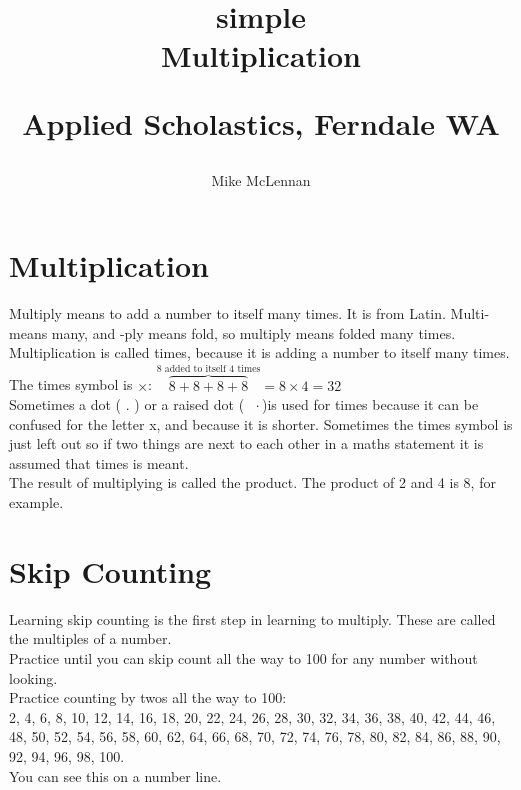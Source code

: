 \documentclass{article}
\author{Mike McLennan}
\date{}
\title{simple\\Multiplication\\
\vspace{28pt}
\begin{normalsize}Applied Scholastics, Ferndale WA \end{normalsize}}
\begin{document}
\maketitle
\pagebreak
\tableofcontents
\pagebreak
\begin{spacing}{1.25}

\section{Multiplication}
Multiply means to add a number to itself many times. It is from Latin. Multi- means many, and -ply means fold, so multiply means folded many times.\\

Multiplication is called times, because it is adding a number to itself many times.\\

The times symbol is $\times$: 
$\overbrace{8+8+8+8}^{\textrm{8 added to itself 4 times}}= 8 \times 4 = 32$\\

Sometimes a dot ( . ) or a raised dot ($\text{ }\cdot$\text{ })is used for times because it can be confused for the letter x, and because it is shorter.
Sometimes the times symbol is just left out so if two things are next to each other in a maths statement it is assumed that times is meant.\\

The result of multiplying is called the product. The product of 2 and 4 is 8, for example.

\newpage

\section{Skip Counting}
Learning skip counting is the first step in learning to multiply. These are called the multiples of a number.\\

Practice until you can skip count all the way to 100 for any number without looking.\\

Practice counting by twos all the way to 100:\\
2, 4, 6, 8, 10, 12, 14, 16, 18, 20, 22, 24, 26, 28, 30, 32, 34, 36, 38, 40, 42, 44, 46, 48, 50, 52, 54, 56, 58, 60, 62, 64, 66, 68, 70, 72, 74, 76, 78, 80, 82, 84, 86, 88, 90, 92, 94, 96, 98, 100.\\

You can see this on a number line.


\end{spacing}
\end{document}
